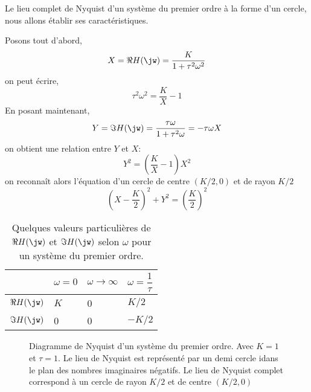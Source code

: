 Le lieu complet de Nyquist d'un système du premier ordre à la forme d'un 
cercle, nous allons établir ses caractéristiques\cite{9782729860127}.

Posons tout d'abord, 
$$
X=\Re{H(\jw)}=\dfrac{K}{1+\tau^2\omega^2}
$$
on peut écrire,
$$
\tau^2\omega^2=\dfrac{K}{X}-1
$$
En posant maintenant, 
$$
Y=\Im{H(\jw)}=\dfrac{\tau\omega}{1+\tau^2\omega}=-\tau\omega X
$$
on obtient une relation entre $Y$ et $X$:
$$
Y^2=\left(\dfrac{K}{X}-1\right)X^2
$$
on reconnaît alors l'équation d'un cercle de centre $(K/2,0)$ et 
de rayon $K/2$
$$
\left(X-\dfrac{K}{2}\right)^2+Y^2=\left(\dfrac{K}{2}\right)^2
$$
\begin{table}
    \centering
    \begin{tabular}{P{2.0cm}P{2.0cm}P{2.0cm}P{2.0cm}}
        \toprule
        & $\omega=0$  & $\omega\to\infty$ & $\omega=\dfrac{1}{\tau}$ \\[0em]
        \midrule
        $\Re{H(\jw)}$ & $K$               & 0               & $K/2$  \\[0em]
        \midrule
        $\Im{H(\jw)}$ & 0                 & 0               & $-K/2$ \\[0em]
        \bottomrule
    \end{tabular}
    \caption{Quelques valeurs particulières de $\Re{H(\jw)}$ et $\Im{H(\jw)}$
    selon $\omega$ pour un système du premier ordre\label{tab-nyquist-vp_1er}.}
\end{table}
\begin{figure}[!h]
    \centering
    
    \caption{Diagramme de Nyquist d'un système du premier ordre. 
             Avec $K=1$ et $\tau=1$. Le lieu de Nyquist 
             est représenté par un demi cercle idans le plan des nombres 
             imaginaires négatifs. Le lieu de Nyquist complet 
             correspond à un cercle de rayon $K/2$ et de centre $(K/2,0)$ 
             \label{fig-nyquist_1er}}
\end{figure}
\newpage
